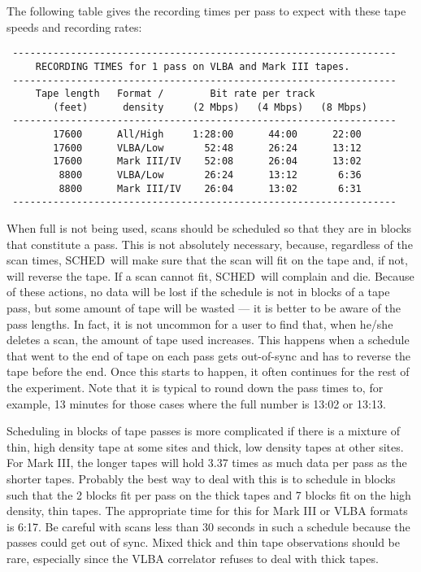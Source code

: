 \documentclass{report}
\newcommand{\schedb}{{\sc SCHED~}}
\begin{document}
The following table gives the recording times per pass to expect with
these tape speeds and recording rates:

\begin{verbatim}
 ------------------------------------------------------------------
     RECORDING TIMES for 1 pass on VLBA and Mark III tapes.
 ------------------------------------------------------------------
     Tape length   Format /        Bit rate per track
        (feet)      density     (2 Mbps)   (4 Mbps)   (8 Mbps)
 ------------------------------------------------------------------
        17600      All/High     1:28:00      44:00      22:00
        17600      VLBA/Low       52:48      26:24      13:12
        17600      Mark III/IV    52:08      26:04      13:02
         8800      VLBA/Low       26:24      13:12       6:36
         8800      Mark III/IV    26:04      13:02       6:31
 ------------------------------------------------------------------
\end{verbatim}


When full  is not
being used, scans should be scheduled so that they are in blocks that
constitute a pass.  This is not absolutely necessary, because,
regardless of the scan times, \schedb will make sure that the scan
will fit on the tape and, if not, will reverse the tape.  If a scan
cannot fit, \schedb will complain and die.  Because of these actions,
no data will be lost if the schedule is not in blocks of a tape pass,
but some amount of tape will be wasted --- it is better to be aware of
the pass lengths.  In fact, it is not uncommon for a user to find that,
when he/she deletes a scan, the amount of tape used increases.  This
happens when a schedule that went to the end of tape on each pass
gets out-of-sync and has to reverse the tape before the end.  Once this
starts to happen, it often continues for the rest of the experiment.
Note that it is typical to round down the pass times to, for
example, 13 minutes for those cases where the full number is 13:02 or
13:13.

Scheduling in blocks of tape passes is more complicated if there is a
mixture of thin, high density tape at some sites and thick, low
density tapes at other sites.  For Mark III, the longer tapes will
hold 3.37 times as much data per pass as the shorter tapes.  Probably
the best way to deal with this is to schedule in blocks such that the
2 blocks fit per pass on the thick tapes and 7 blocks fit on the high
density, thin tapes.  The appropriate time for this for Mark III or
VLBA formats is 6:17.  Be careful with scans less than 30 seconds in
such a schedule because the passes could get out of sync.  Mixed
thick and thin tape observations should be rare, especially since
the VLBA correlator refuses to deal with thick tapes.
\end{document}
